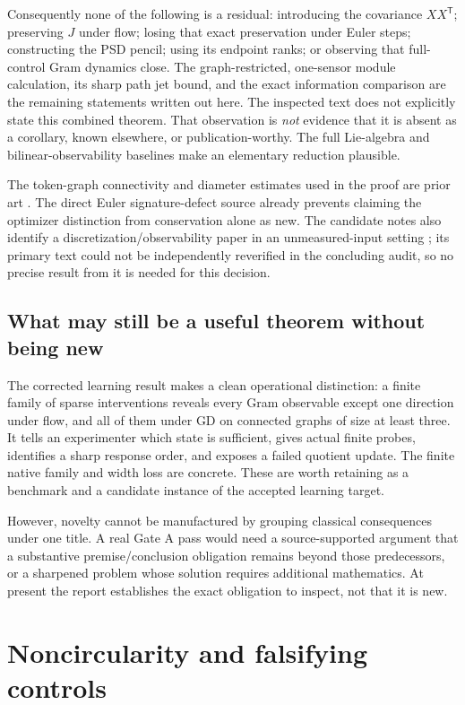\documentclass[11pt]{article}
\theoremstyle{remark}
\begin{document}
Consequently none of the following is a residual: introducing the covariance $XX^{\mathsf T}$; preserving $J$ under flow; losing that exact preservation under Euler steps; constructing the PSD pencil; using its endpoint ranks; or observing that full-control Gram dynamics close. The graph-restricted, one-sensor module calculation, its sharp path jet bound, and the exact information comparison are the remaining statements written out here. The inspected text does not explicitly state this combined theorem. That observation is \emph{not} evidence that it is absent as a corollary, known elsewhere, or publication-worthy. The full Lie-algebra and bilinear-observability baselines make an elementary reduction plausible.

The token-graph connectivity and diameter estimates used in the proof are prior art \cite{Token}. The direct Euler signature-defect source already prevents claiming the optimizer distinction from conservation alone as new. The candidate notes also identify a discretization/observability paper in an unmeasured-input setting \cite{Discretization}; its primary text could not be independently reverified in the concluding audit, so no precise result from it is needed for this decision.

\subsection{What may still be a useful theorem without being new}

The corrected learning result makes a clean operational distinction: a finite family of sparse interventions reveals every Gram observable except one direction under flow, and all of them under GD on connected graphs of size at least three. It tells an experimenter which state is sufficient, gives actual finite probes, identifies a sharp response order, and exposes a failed quotient update. The finite native family and width loss are concrete. These are worth retaining as a benchmark and a candidate instance of the accepted learning target.

However, novelty cannot be manufactured by grouping classical consequences under one title. A real Gate A pass would need a source-supported argument that a substantive premise/conclusion obligation remains beyond those predecessors, or a sharpened problem whose solution requires additional mathematics. At present the report establishes the exact obligation to inspect, not that it is new.

\section{Noncircularity and falsifying controls}
\label{sec:controls}
\end{document}
